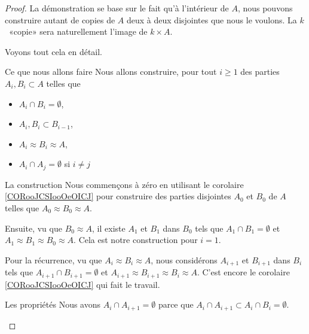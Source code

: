 \begin{proof}
    La démonstration se base sur le fait qu'à l'intérieur de \( A\), nous pouvons construire autant de copies de \( A\) deux à deux disjointes que nous le voulons. La \( k\)\ieme\ «copie» sera naturellement l'image de \( k\times A\).

    Voyons tout cela en détail.
    \begin{subproof}
        \item[Ce que nous allons faire]
            Nous allons construire, pour tout \( i\geq 1 \) des parties \( A_i,B_i\subset A\) telles que
            \begin{itemize}
                \item \( A_i\cap B_i=\emptyset\),
                \item \( A_i,B_i\subset B_{i-1}\),
                \item \( A_i\approx B_i\approx A\),
                \item \( A_i\cap A_j=\emptyset\) si \( i\neq j\)
            \end{itemize}
        \item[La construction]
            Nous commençons à zéro en utilisant le corolaire \ref{CORooJCSIooOeOICJ} pour construire des parties disjointes \( A_0\) et \( B_0\) de \( A\) telles que \( A_0\approx B_0\approx A\).

            Ensuite, vu que \( B_0\approx A\), il existe \( A_1\) et \( B_1\) dans \( B_0\) tels que \(  A_1\cap B_1=\emptyset\) et \( A_1\approx B_1\approx B_0\approx A\). Cela est notre construction pour \( i=1\).

            Pour la récurrence, vu que \( A_i\approx B_i\approx A\), nous considérons \( A_{i+1}\) et \( B_{i+1}\) dans \( B_i\) tels que \( A_{i+1}\cap B_{i+1}=\emptyset\) et \( A_{i+1}\approx B_{i+1}\approx B_i\approx A\). C'est encore le corolaire \ref{CORooJCSIooOeOICJ} qui fait le travail.

        \item[Les propriétés]
            Nous avons \( A_i\cap A_{i+1}=\emptyset\) parce que \( A_i\cap A_{i+1}\subset A_i\cap B_i=\emptyset\).


\end{subproof}
\end{proof}
